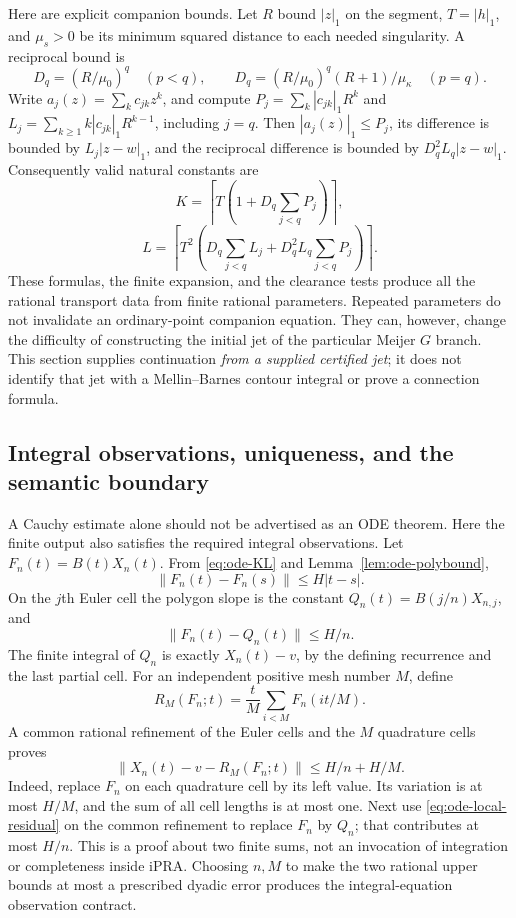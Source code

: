 Here are explicit companion bounds. Let $R$ bound $|z|_1$ on the segment,
$T=|h|_1$, and $\mu_s>0$ be its minimum squared distance to each needed
singularity. A reciprocal bound is
\[
 D_q=(R/\mu_0)^q\quad(p<q),\qquad
 D_q=(R/\mu_0)^q(R+1)/\mu_\kappa\quad(p=q).
\]
Write $a_j(z)=\sum_k c_{jk}z^k$, and compute
$P_j=\sum_k|c_{jk}|_1R^k$ and
$L_j=\sum_{k\ge1}k|c_{jk}|_1R^{k-1}$, including $j=q$.
Then $|a_j(z)|_1\le P_j$, its difference is bounded by
$L_j|z-w|_1$, and the reciprocal difference is bounded by
$D_q^2 L_q|z-w|_1$. Consequently valid natural constants are
\[
 K=\left\lceil T\left(1+D_q\sum_{j<q}P_j\right)\right\rceil,
\]
\[
 L=\left\lceil T^2\left(D_q\sum_{j<q}L_j+
                 D_q^2 L_q\sum_{j<q}P_j\right)\right\rceil.
\]
These formulas, the finite expansion, and the clearance tests produce all
the rational transport data from finite rational parameters. Repeated
parameters do not invalidate an ordinary-point companion equation.
They can, however, change the difficulty of constructing the initial jet
of the particular Meijer $G$ branch. This section supplies continuation
\emph{from a supplied certified jet}; it does not identify that jet with a
Mellin--Barnes contour integral or prove a connection formula.

\subsection{Integral observations, uniqueness, and the semantic boundary}

A Cauchy estimate alone should not be advertised as an ODE theorem. Here the
finite output also satisfies the required integral observations. Let
$F_n(t)=B(t)X_n(t)$. From \eqref{eq:ode-KL} and
Lemma~\ref{lem:ode-polybound},
\[
 \lVert F_n(t)-F_n(s)\rVert\le H|t-s|.
\]
On the $j$th Euler cell the polygon slope is the constant
$Q_n(t)=B(j/n)X_{n,j}$, and
\begin{equation}\label{eq:ode-local-residual}
 \lVert F_n(t)-Q_n(t)\rVert\le H/n.
\end{equation}
The finite integral of $Q_n$ is exactly $X_n(t)-v$, by the defining recurrence
and the last partial cell. For an independent positive mesh number $M$, define
\[
 R_M(F_n;t)=\frac{t}{M}\sum_{i<M}F_n(it/M).
\]
A common rational refinement of the Euler cells and the $M$ quadrature cells
proves
\begin{equation}\label{eq:ode-integral-observation}
 \left\lVert X_n(t)-v-R_M(F_n;t)\right\rVert
 \le H/n+H/M.
\end{equation}
Indeed, replace $F_n$ on each quadrature cell by its left value. Its variation
is at most $H/M$, and the sum of all cell lengths is at most one. Next use
\eqref{eq:ode-local-residual} on the common refinement to replace $F_n$ by
$Q_n$; that contributes at most $H/n$. This is a proof about two finite sums,
not an invocation of integration or completeness inside iPRA. Choosing
$n,M$ to make the two rational upper bounds at most a prescribed dyadic
error produces the integral-equation observation contract.

